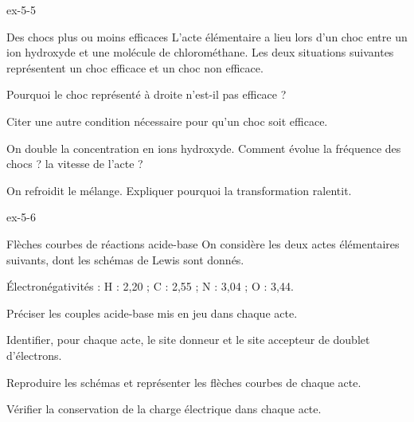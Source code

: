 \begin{blocLivre}{ex-5-5}
\begin{exercice}[1]{Des chocs plus ou moins efficaces}
L'acte élémentaire  a lieu lors d'un choc entre un ion hydroxyde et une molécule
de chlorométhane. Les deux situations suivantes représentent un choc efficace et un choc non efficace.
\begin{questions}
\item Pourquoi le choc représenté à droite n'est-il pas efficace ?
\item Citer une autre condition nécessaire pour qu'un choc soit efficace.
\item On double la concentration en ions hydroxyde. Comment évolue la fréquence des chocs ? la vitesse de l'acte ?
\item On refroidit le mélange. Expliquer pourquoi la transformation ralentit.
\end{questions}
\end{exercice}
\end{blocLivre}
\begin{blocLivre}{ex-5-6}
\begin{exercice}[2]{Flèches courbes de réactions acide-base}
On considère les deux actes élémentaires suivants, dont les schémas de Lewis sont donnés.
\begin{donnees}
Électronégativités : H : 2,20 ; C : 2,55 ; N : 3,04 ; O : 3,44.
\end{donnees}
\begin{questions}
\item Préciser les couples acide-base mis en jeu dans chaque acte.
\item Identifier, pour chaque acte, le site donneur et le site accepteur de doublet d'électrons.
\item Reproduire les schémas et représenter les flèches courbes de chaque acte.
\item Vérifier la conservation de la charge électrique dans chaque acte.
\end{questions}
\end{exercice}
\end{blocLivre}
